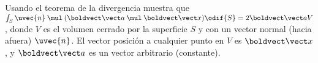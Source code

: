 \documentclass[../main.tex]{subfiles}
\begin{document}
\begin{problema}
	Usando el teorema de la divergencia muestra que \(\int_{S} \crossp{\uvec{n}}{(\crossp{\vb{a}}{\vb{x}})} \odif{S} = 2\vb{a}V\),
	donde \(V\) es el volumen cerrado por la superficie \(S\) y con
	un vector normal (hacia afuera) \(\uvec{n}\). El vector posición
	a cualquier punto en \(V\) es \(\vb{x}\), y \(\vb{a}\) es un
	vector arbitrario (constante).
\end{problema}
\end{document}
